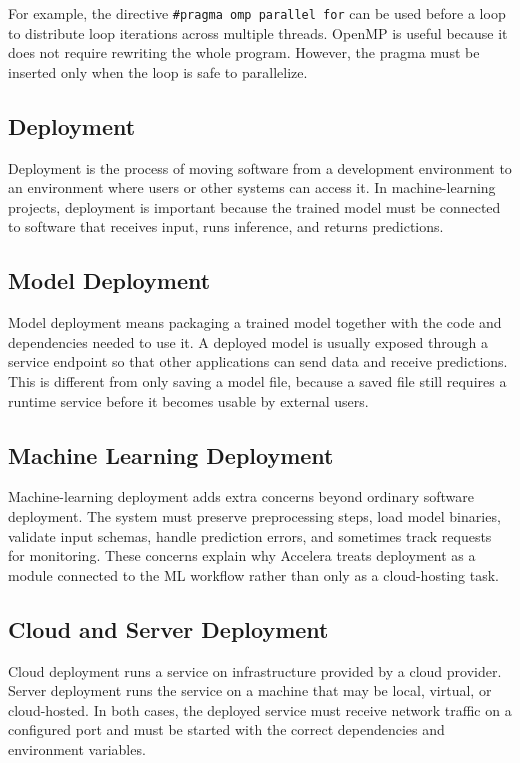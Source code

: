 \documentclass[12pt,a4paper]{report}
\begin{document}
For example, the directive \texttt{\#pragma omp parallel for} can be used before
a loop to distribute loop iterations across multiple threads. OpenMP is useful
because it does not require rewriting the whole program. However, the pragma must
be inserted only when the loop is safe to parallelize.

\subsection{Deployment}
Deployment is the process of moving software from a development environment to
an environment where users or other systems can access it. In machine-learning
projects, deployment is important because the trained model must be connected
to software that receives input, runs inference, and returns predictions.

\subsection{Model Deployment}
Model deployment means packaging a trained model together with the code and
dependencies needed to use it. A deployed model is usually exposed through a
service endpoint so that other applications can send data and receive
predictions. This is different from only saving a model file, because a saved
file still requires a runtime service before it becomes usable by external
users.

\subsection{Machine Learning Deployment}
Machine-learning deployment adds extra concerns beyond ordinary software
deployment. The system must preserve preprocessing steps, load model binaries,
validate input schemas, handle prediction errors, and sometimes track requests
for monitoring. These concerns explain why Accelera treats deployment as a
module connected to the ML workflow rather than only as a cloud-hosting task.

\subsection{Cloud and Server Deployment}
Cloud deployment runs a service on infrastructure provided by a cloud provider.
Server deployment runs the service on a machine that may be local, virtual, or
cloud-hosted. In both cases, the deployed service must receive network traffic
on a configured port and must be started with the correct dependencies and
environment variables.
\end{document}
